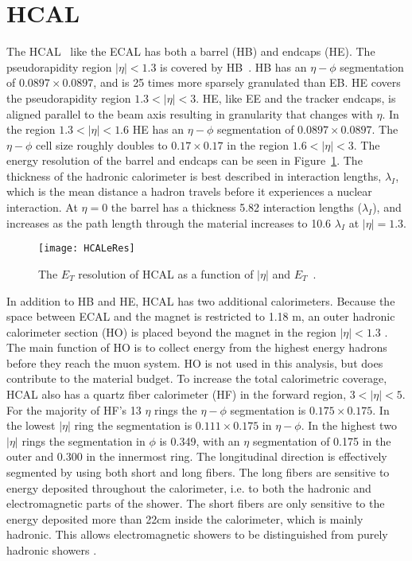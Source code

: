   \section{HCAL}
    The HCAL~\cite{Baiatian:2007xva} like the ECAL has both a barrel (HB) and endcaps (HE).
    The pseudorapidity region $|\eta|<1.3$ is covered by HB~\cite{tCmsE}. 
    HB has an $\eta-\phi$ segmentation of $0.0897\times0.0897$, and is 25 times more
    	sparsely granulated than EB.
    HE covers the pseudorapidity region $1.3<|\eta|<3$.
    HE, like EE and the tracker endcaps, is aligned parallel to the beam axis
    	resulting in granularity that changes with $\eta$.
    In the region $1.3 <|\eta|< 1.6$ HE has an $\eta-\phi$ segmentation of 
    	$0.0897\times0.0897$.
    The $\eta-\phi$ cell size roughly doubles to $0.17\times0.17$ in the region
    	$1.6 <|\eta|< 3$.
    The energy resolution of the barrel and endcaps can be seen in  
    	Figure~\ref{HCALeRes}.
    The thickness of the hadronic calorimeter is best described in interaction
    	lengths, $\lambda_I$, which is the mean distance a hadron travels before 
       it experiences a nuclear interaction.
    At $\eta = 0$ the barrel has a thickness 5.82 interaction lengths 
    	($\lambda_{I}$), and increases as the path length through the material 
    	increases to 10.6 $\lambda_{I}$ at $|\eta| = 1.3$.
    \begin{figure}[h]
      \centering
        \texttt{[image: HCALeRes]}
      \caption{The $E_{T}$ resolution of HCAL as a function of $|\eta|$ and 
        $E_{T}$~\cite{tCmsE}.}
      \label{HCALeRes}
    \end{figure}

    In addition to HB and HE, HCAL has two additional calorimeters.
    Because the space between ECAL and the magnet is restricted to 1.18 m, an
    	outer hadronic calorimeter section (HO) is placed beyond the magnet
    	in the region $|\eta|<1.3$ \cite{tCmsE}.
    The main function of HO is to collect energy from the highest energy hadrons
    	before they reach the muon system.
    HO is not used in this analysis, but does contribute to the material budget. 
    To increase the total calorimetric coverage, HCAL also has a quartz fiber 
    	calorimeter (HF) in the forward region, $3 < |\eta| < 5$.
    For the majority of HF's 13 $\eta$ rings the $\eta-\phi$ segmentation is 
    	$0.175\times0.175$.
    In the lowest $|\eta|$ ring the segmentation is $0.111\times0.175$ in 
    	$\eta-\phi$.
    In the highest two $|\eta|$ rings the segmentation in $\phi$ is 0.349, with an
    	$\eta$ segmentation of 0.175 in the outer and 0.300 in the innermost 
    	ring. 
    The longitudinal direction is effectively segmented by using both short and
    	long fibers.
    The long fibers are sensitive to energy deposited throughout the calorimeter, i.e. to both the hadronic and electromagnetic parts of the shower. The short fibers are only sensitive to the energy deposited more than 22cm inside the calorimeter, which is mainly hadronic. 
    This allows electromagnetic showers to be distinguished from purely
      hadronic showers \cite{tCmsE}.

